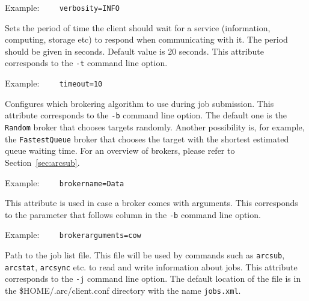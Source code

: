 Example:
\verb#    verbosity=INFO#

{}
\hspace*{0.5cm}
\begin{shaded}
\end{shaded}
Sets the period of time the client should wait for a service (information,
computing, storage etc) to respond when communicating with it. The period
should be given in seconds. Default value is 20 seconds. This attribute
corresponds to the \verb#-t# command line option.

Example:
\verb#    timeout=10#

{}
\hspace*{0.5cm}
\begin{shaded}
\end{shaded}

Configures which brokering algorithm to use during job submission. This attribute
corresponds to the \verb#-b# command line option. The
default one is the \texttt{Random} broker that chooses targets randomly.
Another possibility is, for example, the \texttt{FastestQueue} broker that
chooses the target with the shortest estimated queue waiting time. For an 
overview of brokers, please refer to Section~\ref{sec:arcsub}.

 Example:
\verb#    brokername=Data#

{}
\hspace*{0.5cm}
\begin{shaded}
\end{shaded}

This attribute is used in case a broker comes with arguments. This corresponds to the
parameter that follows column in the \verb#-b# command line option.

Example:
\verb#    brokerarguments=cow#

{}
\hspace*{0.5cm}
\begin{shaded}
\end{shaded}

Path to the job list file. This file will be used by commands such as \texttt{arcsub}, \texttt{arcstat},
\texttt{arcsync} etc. to read and write information about jobs. This attribute
corresponds to the \verb#-j# command line option. The default
location of the file is in the {\$}HOME/.arc/client.conf directory with the
name \texttt{jobs.xml}.

